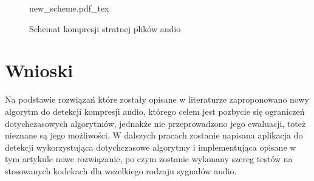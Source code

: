 \documentclass[12pt]{oska}
\let\Oldsection\section
\renewcommand{\section}{\FloatBarrier\Oldsection}
\begin{document}
\begin{figure}[!tbh]
  \centering
  {new_scheme.pdf_tex}
  \caption{Schemat kompresji stratnej plików audio}
  \label{fig:new_scheme}
\end{figure}

\section{Wnioski}

Na podstawie rozwiązań które zostały opisane w literaturze zaproponowano nowy
algorytm do detekcji kompresji audio, którego celem jest pozbycie się
ograniczeń dotychczasowych algorytmów, jednakże nie przeprowadzono jego
ewaluacji, toteż nieznane są jego możliwości. W dalszych pracach zostanie
napisana aplikacja do detekcji wykorzystująca dotychczasowe algorytmy i
implementująca opisane w tym artykule nowe rozwiązanie, po czym zostanie
wykonany szereg testów na stosowanych kodekach dla wszelkiego rodzaju sygnałów
audio.

\printbibliography
\end{document}
